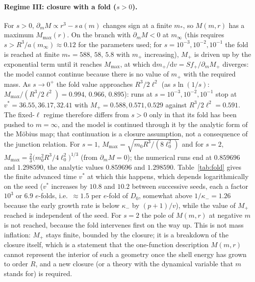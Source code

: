 \documentclass[11pt]{article}
\newcommand{\dd}{\mathrm{d}}
\begin{document}
\paragraph{Regime III: closure with a fold ($s>0$).} For $s>0$, $\partial_mM\propto r^3-s\,a(m)$ changes sign at a finite $m_*$, so $M(m,r)$ has a maximum $M_{\max}(r)$. On the branch with $\partial_mM<0$ at $m_\infty$ (this requires $s>R^3/a(m_\infty)\approx0.12$ for the parameters used; for $s=10^{-3},10^{-2},10^{-1}$ the fold is reached at finite $m_*=588,\,58,\,5.8$ with $m_+$ increasing), $M_+$ is driven up by the exponential term until it reaches $M_{\max}$, at which $\dd m_+/\dd v=S f_+/\partial_mM_+$ diverges: the model cannot continue because there is no value of $m_+$ with the required mass. As $s\to0^+$ the fold value approaches $R^3/2\ell^2$ (as $s\ln(1/s)$: $M_{\max}/(R^3/2\ell^2)=0.994,\,0.966,\,0.895$): runs at $s=10^{-3},10^{-2},10^{-1}$ stop at $v^*=36.55,36.17,32.41$ with $M_+=0.588,0.571,0.529$ against $R^3/2\ell^2=0.591$. The fixed-$\ell$ regime therefore differs from $s>0$ only in that its fold has been pushed to $m=\infty$, and the model is continued through it by the analytic form of the M\"obius map; that continuation is a closure assumption, not a consequence of the junction relation. For $s=1$, $M_{\max}=\sqrt{m_0R^3/(8\ell_0^2)}$ and for $s=2$, $M_{\max}=\tfrac23\bigl(m_0^2R^3/4\ell_0^2\bigr)^{1/3}$ (from $\partial_mM=0$); the numerical runs end at $0.859696$ and $1.298590$, the analytic values $0.859696$ and $1.298590$. Table~\ref{tab:fold} gives the finite advanced time $v^*$ at which this happens, which depends logarithmically on the seed ($v^*$ increases by $10.8$ and $10.2$ between successive seeds, each a factor $10^3$ or $6.9$ $e$-folds, i.e.\ $\approx1.5$ per $e$-fold of $D_0$, somewhat above $1/\kappa_-=1.26$ because the early growth rate is below $\kappa_-$ by $(p+1)/v$), while the value of $M_+$ reached is independent of the seed. For $s=2$ the pole of $M(m,r)$ at negative $m$ is not reached, because the fold intervenes first on the way up. This is not mass inflation: $M_+$ stays finite, bounded by the closure; it is a breakdown of the closure itself, which is a statement that the one-function description $M(m,r)$ cannot represent the interior of such a geometry once the shell energy has grown to order $R$, and a new closure (or a theory with the dynamical variable that $m$ stands for) is required.
\end{document}
